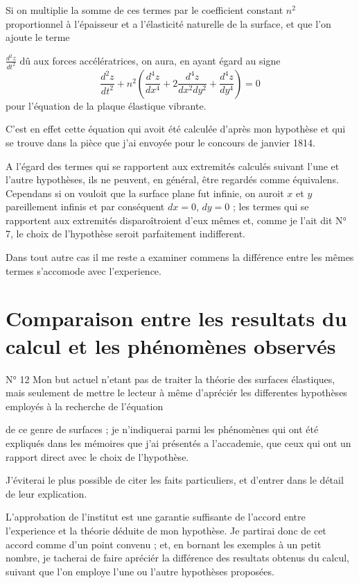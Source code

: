 \documentclass[11pt,a4paper]{article}
\begin{document}
Si on multiplie la somme de ces termes par le coefficient constant $n^{2}$
proportionnel à l'épaisseur et a l'élasticité naturelle de la surface, et que
l'on ajoute le terme

$\frac{d^{2}z}{dt^{2}}$ dû aux forces accélératrices, on aura, en ayant égard
au signe
\[
  \frac{d^{2}z}{dt^{2}} + n^{2}\left( \frac{d^{4}z}{dx^{4}}
  + 2\frac{d^{4}z}{dx^{2}dy^{2}} + \frac{d^{4}z}{dy^{4}} \right) = 0
\]
pour l'équation de la plaque élastique vibrante.

C'est en effet cette équation qui avoit été calculée d'après mon hypothèse et
qui se trouve dans la pièce que j'ai envoyée pour le concours de janvier 1814.

A l'égard des termes qui se rapportent aux extremités calculés suivant l'une
et l'autre hypothèses, ils ne peuvent, en général, être regardés comme
équivalens. Cependans si on vouloit que la surface plane fut infinie, on
auroit $x$ et $y$ pareillement infinis et par conséquent $dx = 0$, $dy = 0$ ;
les termes qui se rapportent aux extremités disparoîtroient d'eux mêmes et,
comme je l'ait dit N° 7, le choix de l'hypothèse seroit parfaitement
indifferent.

Dans tout autre cas il me reste a examiner commens la différence entre les
mêmes termes s'accomode avec l'experience.

\section{Comparaison entre les resultats du calcul et les phénomènes observés}

N° 12 Mon but actuel n'etant pas de traiter la théorie des surfaces
élastiques, mais seulement de mettre le lecteur à même d'apréciér les
differentes hypothèses employés à la recherche de l'équation

de ce genre de surfaces ; je n'indiquerai parmi les phénomènes qui ont été
expliqués dans les mémoires que j'ai présentés a l'accademie, que ceux qui ont
un rapport direct avec le choix de l'hypothèse.

J'éviterai le plus possible de citer les faits particuliers, et d'entrer dans
le détail de leur explication.

L'approbation de l'institut est une garantie suffisante de l'accord entre
l'experience et la théorie déduite de mon hypothèse. Je partirai donc de cet
accord comme d'un point convenu ; et, en bornant les exemples à un petit
nombre, je tacherai de faire apréciér la différence des resultats obtenus du
calcul, suivant que l'on employe l'une ou l'autre hypothèses proposées.
\end{document}
